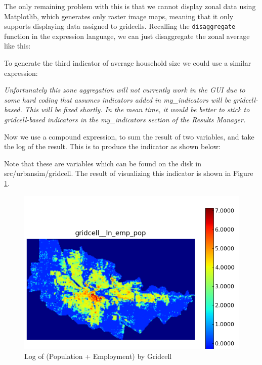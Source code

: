 
The only remaining problem with this is that we cannot display zonal data using Matplotlib, which generates only raster image maps, meaning that it only supports displaying data assigned to gridcells.  Recalling the \verb#disaggregate# function in the expression language, we can just disaggregate the zonal average like this:


To generate the third indicator of average household size we could use a similar expression:


\emph{Unfortunately this zone aggregation will not currently work in the GUI due to some hard coding that assumes indicators added in my\_indicators will be gridcell-based.  This will be fixed shortly.  In the mean time, it would be better to stick to gridcell-based indicators in the my\_indicators section of the Results Manager.}

Now we use a compound expression, to sum the result of two variables, and take the log of the result.  This is to produce the indicator as shown below:


Note that these are variables which can be found on the disk in src/urbansim/gridcell.  The result of visualizing this indicator is shown in Figure \ref{fig:indicator-ln-emp-pop}.

\begin{figure}[htp]
\begin{center}
\includegraphics[scale=0.4]{graphics/indicator-ln-emp-pop.png}
\end{center}
\caption{Log of (Population + Employment) by Gridcell}
\label{fig:indicator-ln-emp-pop}
\end{figure}

